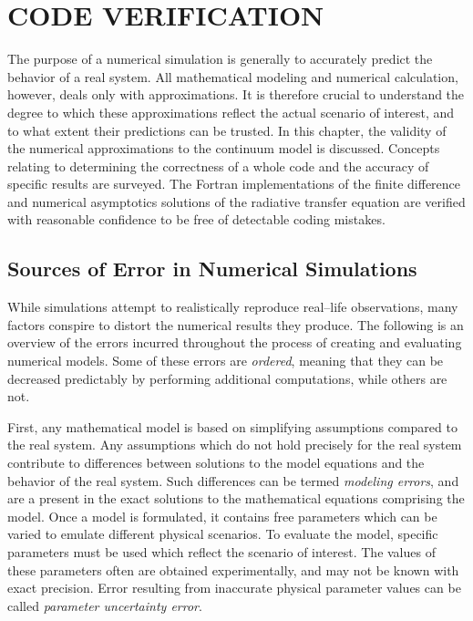 \chapter{CODE VERIFICATION}
\label{chap:model_analysis}
The purpose of a numerical simulation is generally to accurately predict the behavior of a real system.
All mathematical modeling and numerical calculation, however, deals only with approximations.
It is therefore crucial to understand the degree to which these approximations reflect the actual scenario of interest, and to what extent their predictions can be trusted.
In this chapter, the validity of the numerical approximations to the continuum model is discussed.
Concepts relating to determining the correctness of a whole code and the accuracy of specific results are surveyed.
The Fortran implementations of the finite difference and numerical asymptotics solutions of the radiative transfer equation are verified with reasonable confidence to be free of detectable coding mistakes.

\section{Sources of Error in Numerical Simulations}
While simulations attempt to realistically reproduce real--life observations, many factors conspire to distort the numerical results they produce.
The following is an overview of the errors incurred throughout the process of creating and evaluating numerical models.
Some of these errors are \textit{ordered}, meaning that they can be decreased predictably by performing additional computations, while others are not.

First, any mathematical model is based on simplifying assumptions compared to the real system.
Any assumptions which do not hold precisely for the real system contribute to differences between solutions to the model equations and the behavior of the real system.
Such differences can be termed \textit{modeling errors}, and are a present in the exact solutions to the mathematical equations comprising the model.
Once a model is formulated, it contains free parameters which can be varied to emulate different physical scenarios.
To evaluate the model, specific parameters must be used which reflect the scenario of interest.
The values of these parameters often are obtained experimentally, and may not be known with exact precision.
Error resulting from inaccurate physical parameter values can be called \textit{parameter uncertainty error}.

